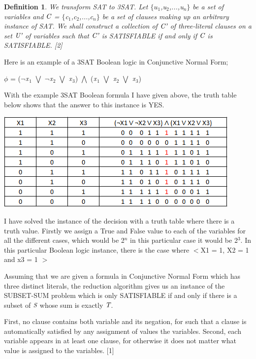 \documentclass[a4paper]{report}
\newtheorem{defi}{Definition}
\begin{document}
\begin{defi}
We transform SAT to 3SAT. Let $\lbrace$$u_{1}$,u$_{2}$,...,u$_{n}$$\rbrace$ be a set of variables and $\emph{C}$ = $\lbrace$c$_{1}$,c$_{2}$,...,c$_{n}$$\rbrace$ be a set of clauses making up an arbitrary instance of SAT. We shall construct a collection of $\emph{C'}$ of three-literal clauses on a set $\emph{U'}$ of variables such that $\emph{C'}$ is SATISFIABLE if and only if $\emph{C}$ is SATISFIABLE. [2]
\end{defi}

Here is an example of a 3SAT Boolean logic in Conjunctive Normal Form;

$\phi$ = ($\neg$$\emph{x}$$_{1}$ $\bigvee$ $\neg$$\emph{x}$$_{2}$ $\bigvee$ $\emph{x}$$_{3}$) $\bigwedge$ ($\emph{x}$$_{1}$ $\bigvee$ $\emph{x}$$_{2}$ $\bigvee$ $\emph{x}$$_{3}$)

\vspace{2mm}
With the example 3SAT Boolean formula I have given above, the truth table below shows that the answer to this instance is YES.

\begin{center}
\includegraphics[scale=0.60]{truthtable.png}
\end{center}

I have solved the instance of the decision with a truth table where there is a truth value. Firstly we assign a True and False value to each of the variables for all the different cases, which would be 2$^{n}$ in this particular case it would be 2$^{3}$. In this particular Boolean logic instance, there is the case where $<$X1 = 1, X2 = 1 and x3 = 1 $>$

\vspace{3mm}
Assuming that we are given a formula in Conjunctive Normal Form which has three distinct literals, the reduction algorithm gives us an instance of the SUBSET-SUM problem which is only SATISFIABLE if and only if there is a subset of $\emph{S}$ whose sum  is exactly $\emph{T}$.

\vspace{3mm}
First, no clause contains both variable and its negation, for such that a clause is automatically satisfied by any assignment of values the variables. Second, each variable appears in at least one clause, for otherwise it does not matter what value is assigned to the variables. [1]
\end{document}
